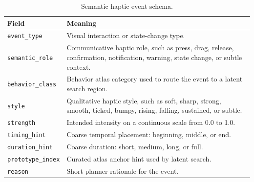 \begin{table}[t]
\centering
\caption{Semantic haptic event schema.}
\label{tab:semantic-event-schema}
\renewcommand{\arraystretch}{1.1}
\begin{tabular}{@{}>{\raggedright\arraybackslash}p{1.45in}>{\raggedright\arraybackslash}p{4.35in}@{}}
\hline
\textbf{Field} & \textbf{Meaning} \\
\hline
\texttt{event\_type} & Visual interaction or state-change type. \\
\texttt{semantic\_role} & Communicative haptic role, such as press, drag, release, confirmation, notification, warning, state change, or subtle context. \\
\texttt{behavior\_class} & Behavior atlas category used to route the event to a latent search region. \\
\texttt{style} & Qualitative haptic style, such as soft, sharp, strong, smooth, ticked, bumpy, rising, falling, sustained, or subtle. \\
\texttt{strength} & Intended intensity on a continuous scale from 0.0 to 1.0. \\
\texttt{timing\_hint} & Coarse temporal placement: beginning, middle, or end. \\
\texttt{duration\_hint} & Coarse duration: short, medium, long, or full. \\
\texttt{prototype\_index} & Curated atlas anchor hint used by latent search. \\
\texttt{reason} & Short planner rationale for the event. \\
\hline
\end{tabular}
\end{table}
